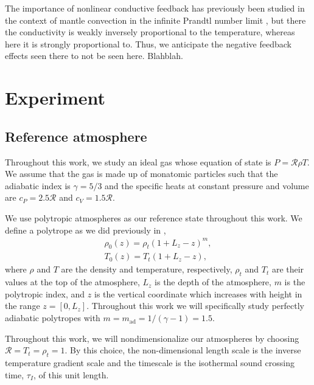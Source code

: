 \documentclass[twocolumn, amsmath, amsfonts, amssymb]{aastex62}
\begin{document}
The importance of nonlinear conductive feedback has previously been studied in
the context of mantle convection in the infinite Prandtl number limit
\citep{dubuffet&all2000}, but there the conductivity is weakly inversely proportional
to the temperature, whereas here it is strongly proportional to. Thus, we anticipate
the negative feedback effects seen there to not be seen here. Blahblah.





\section{Experiment} \label{sec:experiment}
\subsection{Reference atmosphere}
Throughout this work, we study an ideal gas whose equation of state is
$P = \mathcal{R}\rho T$. We assume that the gas is made up of monatomic
particles such that the adiabatic index is $\gamma = 5/3$ and the specific
heats at constant pressure and volume are $c_P = 2.5\mathcal{R}$ and $c_V = 1.5\mathcal{R}$.

We use polytropic atmospheres as our reference state throughout this work.
We define a polytrope as we did previously in \cite{anders&brown2017},
\begin{gather}
\rho_0(z) = \rho_{t}(1 + L_z - z)^m, \\
T_0(z)    = T_{t}(1 + L_z - z),
\end{gather}
where $\rho$ and $T$ are the density and temperature, respectively,
$\rho_{t}$ and $T_{t}$ are their values at the top of the atmosphere,
$L_z$ is the depth of the atmosphere, $m$ is the polytropic index,
and $z$ is the vertical coordinate which increases with height in the
range $z=[0,L_z]$.
Throughout this work we will specifically study perfectly adiabatic
polytropes with $m = m_{\text{ad}} = 1/(\gamma - 1) = 1.5$.

Throughout this work, we will nondimensionalize our atmospheres by choosing
$\mathcal{R} = T_t = \rho_t = 1$.
By this choice, the non-dimensional
length scale is the inverse temperature gradient scale and the 
timescale is the isothermal sound crossing time, 
$\tau_I$, of this unit length.
\end{document}
